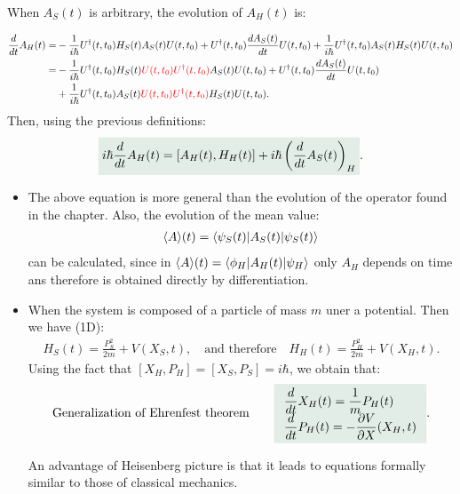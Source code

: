 When $A_S(t)$ is arbitrary, the evolution of $A_H(t)$ is:

\begin{align*}
    \frac{d}{dt}A_H(t)=&-\frac{1}{i\hbar}U^\dagger(t,t_0)H_S(t)A_S(t)U(t,t_0)+U^\dagger(t,t_0)\frac{dA_S(t)}{dt}U(t,t_0)+\frac{1}{i\hbar}U^\dagger(t,t_0)A_S(t)H_S(t)U(t,t_0)\\
    =&-\frac{1}{i\hbar}U^\dagger(t,t_0)H_S(t)\textcolor{red}{U(t,t_0)U^\dagger(t,t_0)}A_S(t)U(t,t_0)+U^\dagger(t,t_0)\frac{dA_S(t)}{dt}U(t,t_0)\\
    &+\frac{1}{i\hbar}U^\dagger(t,t_0)A_S(t)\textcolor{red}{U(t,t_0)U^\dagger(t,t_0)}H_S(t)U(t,t_0).
\end{align*}
Then, using the previous definitions:
\begin{align}
    \highlight{i\hbar\frac{d}{dt}A_H(t)=[A_H(t),H_H(t)]+i\hbar\left(\frac{d}{dt}A_S(t)\right)_H}.
\end{align}

\begin{itemize}[itemsep=0pt,topsep=0pt]
    \item The above equation is more general than the evolution of the operator found in the chapter. Also, the evolution of the mean value:
        \begin{align*}
            \langle A\rangle(t)=\langle\psi_S(t)|A_S(t)|\psi_S(t)\rangle
        \end{align*}    
        can be calculated, since in $\langle A\rangle(t)=\langle\phi_H|A_H(t)|\psi_H\rangle$ only $A_H$ depends on time ans therefore is obtained directly by differentiation.
    \item When the system is composed of a particle of mass $m$ uner a potential. Then we have (1D):
    \begin{align*}
        H_S(t)=\frac{P_S^2}{2m}+V(X_S,t),\quad\text{and therefore}\quad H_H(t)=\frac{P_H^2}{2m}+V(X_H,t).
    \end{align*}
    Using the fact that $[X_H,P_H]=[X_S,P_S]=i\hbar$, we obtain that:
    \begin{align}
        \text{Generalization of Ehrenfest theorem}\qquad\highlight{\begin{array}{l}
            \displaystyle\frac{d}{dt}X_H(t)=\frac{1}{m}P_H(t)\\
            \displaystyle\frac{d}{dt}P_H(t)=-\frac{\partial V}{\partial X}(X_H,t)
        \end{array}}.
    \end{align}
    \begin{emphasizer}
        An advantage of Heisenberg picture is that it leads to equations formally similar to those of classical mechanics.
    \end{emphasizer}
\end{itemize}


